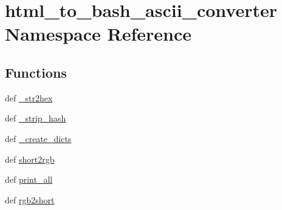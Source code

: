 \section{html\-\_\-to\-\_\-bash\-\_\-ascii\-\_\-converter Namespace Reference}
\label{namespacehtml__to__bash__ascii__converter}
\subsection*{Functions}
\begin{DoxyCompactItemize}
\item 
def \hyperlink{namespacehtml__to__bash__ascii__converter_a3b9f5fd3c97b5c8b7333abbd0568323d}{\-\_\-str2hex}
\item 
def \hyperlink{namespacehtml__to__bash__ascii__converter_a6e7ad33e9bf85bf2632b3ac5c89f18bf}{\-\_\-strip\-\_\-hash}
\item 
def \hyperlink{namespacehtml__to__bash__ascii__converter_aeb6bf817c2e2c3970813b6034d1900c4}{\-\_\-create\-\_\-dicts}
\item 
def \hyperlink{namespacehtml__to__bash__ascii__converter_a745280733af625472cc51ab206a4d1d2}{short2rgb}
\item 
def \hyperlink{namespacehtml__to__bash__ascii__converter_a3f5102f497963761def2ae8bb1ac66ba}{print\-\_\-all}
\item 
def \hyperlink{namespacehtml__to__bash__ascii__converter_a20af4bd8239fdfa16eec951663fd2a70}{rgb2short}
\end{DoxyCompactItemize}
